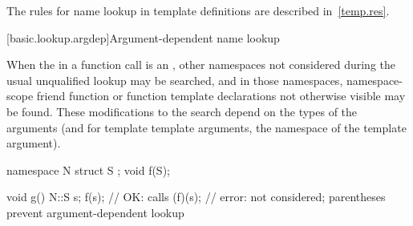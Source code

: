 \pnum
\begin{note} The rules for name lookup in template definitions are
described in~\ref{temp.res}. \end{note}

[basic.lookup.argdep]{Argument-dependent name lookup}%

\pnum
When the  in
a function call is an , other namespaces not considered
during the usual unqualified lookup may be
searched, and in those namespaces, namespace-scope friend function or
function template declarations not otherwise
visible may be found.
These modifications to the search depend on the types of the arguments
(and for template template arguments, the namespace of the template
argument).
\begin{example}
\begin{codeblock}
namespace N {
  struct S { };
  void f(S);
}

void g() {
  N::S s;
  f(s);             // OK: calls 
  (f)(s);           // error:  not considered; parentheses prevent argument-dependent lookup
}
\end{codeblock}
\end{example}

